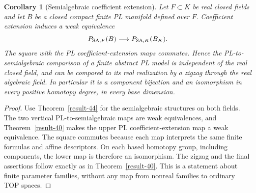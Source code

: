 \documentclass[11pt,a4paper]{article}
\newtheorem{corollary}[theorem]{Corollary}
\theoremstyle{definition}
\begin{document}
\begin{corollary}[Semialgebraic coefficient extension]\label{result-52}
Let $F\subset K$ be real closed fields and let $B$ be a closed compact
finite PL manifold defined over $F$. Coefficient extension induces a
weak equivalence
\[
          P_{{\rm SA},F}(B)\longrightarrow P_{{\rm SA},K}(B_K).
\]
The square with the PL coefficient-extension maps commutes. Hence the
PL-to-semialgebraic comparison of a finite abstract PL model is
independent of the real closed field, and can be compared to its real
realization by a zigzag through the real algebraic field. In particular
it is a component bijection and an isomorphism in every positive
homotopy degree, in every base dimension.
\end{corollary}
\begin{proof}
Use Theorem~\ref{result-44} for the semialgebraic structures on both
fields. The two vertical PL-to-semialgebraic maps are weak equivalences,
and Theorem~\ref{result-40} makes the upper PL coefficient-extension
map a weak equivalence. The square commutes because each map interprets
the same finite formulas and affine descriptors. On each based homotopy
group, including components, the lower map is therefore an isomorphism.
The zigzag and the final assertions follow exactly as in
Theorem~\ref{result-40}. This is a statement about finite parameter
families, without any map from nonreal families to ordinary TOP spaces.
\end{proof}
\end{document}
